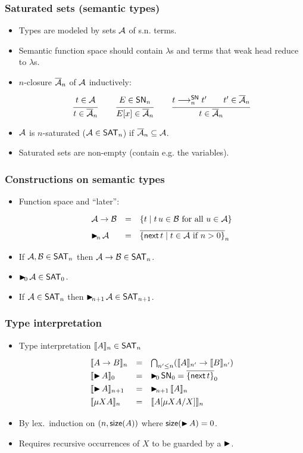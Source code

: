 \documentclass[t]{beamer}
\newcommand{\nex}{\tnext\,}
\newcommand{\redSN}{\red^\SN}
\newcommand{\clos}[1]{\overline{#1}}
\renewcommand{\SN}{\mathsf{SN}}
\newcommand{\SAT}{\mathsf{SAT}}
\newcommand{\slater}[1]{\tlater\!_{#1}\,}
\newcommand{\cAnn}{\color{red!80!black}}%
\renewcommand{\emph}[1]{{\cAnn#1}}
\begin{document}
\begin{frame}%
  \frametitle{Saturated sets (semantic types)}
  \begin{itemize}
  \item Types are modeled by sets $\mathcal{A}$ of s.n. terms.
  \item Semantic function space should contain $\lambda$s and terms
    that weak head reduce to $\lambda$s.
  \item $n$-closure $\clos \A _n$ of $\mathcal{A}$ inductively:
\[
  \ru{t \in \A}{t \in \clos \A _n}
\qquad
  \ru{E \in \SN_n}{E[x] \in \clos \A _n}
\qquad
  \ru{t \redSN_n t' \qquad t' \in \clos \A _n
    }{t \in \clos \A _n}
\]
  \item $\mathcal{A}$ is $n$-saturated ($\A \in \SAT_n$) if $\clos\A_n
    \subseteq \A$.
  \item Saturated sets are non-empty (contain e.g. the variables).
  \end{itemize}
\end{frame}


\begin{frame}%
  \frametitle{Constructions on semantic types}
  \begin{itemize}
  \item Function space and ``later'':
\[
\begin{array}{lcl}
  \A \to \B   & = & \{ t \mid t\,u \in \B \mforall u \in \A \} \\[1ex]
  \slater n \A & = & \clos{\{ \nex t \mid t \in \A \mif n>0 \}}_n \\
\end{array}
\]
  \item If $\A,\B \in \SAT_n$ then $\A \to \B \in \SAT_n$.
  \item $\slater 0 \A \in \SAT_0$.
  \item If $\A \in \SAT_n$ then $\slater {n+1} \A \in \SAT_{n+1}$.
  \end{itemize}
\end{frame}


\begin{frame}%
  \frametitle{Type interpretation}
  \begin{itemize}
  \item Type interpretation $\Den A n \in \SAT_n$
\[
\def\arraystretch{1.3}
 \begin{array}{lcl}
   \Den{A \to B}n & = & \bigcap_{n' \leq n} (\Den A{n'} \to \Den{B}{n'})
   \\
   \Den{\later A}0 & = & \slater 0 \SN_0 = \clos{\{ \nex t \}}_0 \\
   \Den{\later A}{n+1} & = & \slater{n+1} \Den A n \\
   \Den{\mu X A}n & = & \Den{\subst {\mu X A} X A}n \\
 \end{array}
\]
\vspace{-2ex}
\item
By lex.\ induction on $(n,\mathsf{size}(A))$ where $\mathsf{size}(\mathord{\blacktriangleright}\, A) = 0$.
\item Requires recursive occurrences of $X$ to be \emph{guarded} by a $\mathord{\blacktriangleright}$.
  \end{itemize}
\end{frame}
\end{document}
